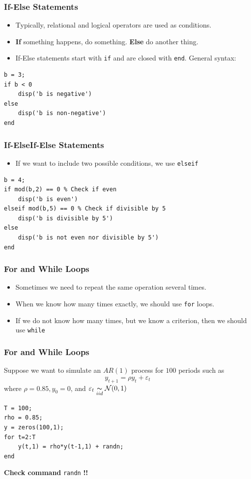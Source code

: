 \documentclass[11pt,xcolor={svgnames},aspectratio=169,usepdftitle=false]{beamer}
\begin{document}
\begin{frame}[fragile]
    \frametitle{If-Else Statements}
    \begin{itemize}
        \item Typically, relational and logical operators are used as conditions.
        \item \alert{\textbf{If}} something happens, do something. \alert{\textbf{Else}} do another thing.
        \item If-Else statements start with \verb;if; and are closed with \verb;end;. General syntax:
    \end{itemize}
\begin{lstlisting}
b = 3;
if b < 0
    disp('b is negative')
else
    disp('b is non-negative')
end
\end{lstlisting}
\end{frame}

\begin{frame}[fragile]
    \frametitle{If-ElseIf-Else Statements}
\begin{itemize}
    \item If we want to include two possible conditions, we use \verb;elseif;
\end{itemize}
\begin{lstlisting}
b = 4;
if mod(b,2) == 0 % Check if even
    disp('b is even')
elseif mod(b,5) == 0 % Check if divisible by 5
    disp('b is divisible by 5')
else
    disp('b is not even nor divisible by 5')
end
\end{lstlisting}
\end{frame}

\begin{frame}[fragile]
    \frametitle{For and While Loops}
\begin{itemize}
    \item Sometimes we need to repeat the same operation several times.
    \item When we know how many times exactly, we should use \verb;for; loops.
    \item If we do not know how many times, but we know a criterion, then we should use \verb;while;
\end{itemize}
\end{frame}

\begin{frame}[fragile]
    \frametitle{For and While Loops}
Suppose we want to simulate an $AR(1)$ process for $100$ periods such as
\[
y_{t+1} = \rho y_t + \varepsilon_t
\]
where $\rho = 0.85,y_0 = 0$, and $\varepsilon_t \underset{iid}{\thicksim} \mathcal{N}(0,1)$

\begin{lstlisting}
T = 100;
rho = 0.85;
y = zeros(100,1);
for t=2:T
    y(t,1) = rho*y(t-1,1) + randn;
end
\end{lstlisting}
\alert{\textbf{Check command}} \verb;randn; \alert{\textbf{!!}}
\end{frame}
\end{document}
